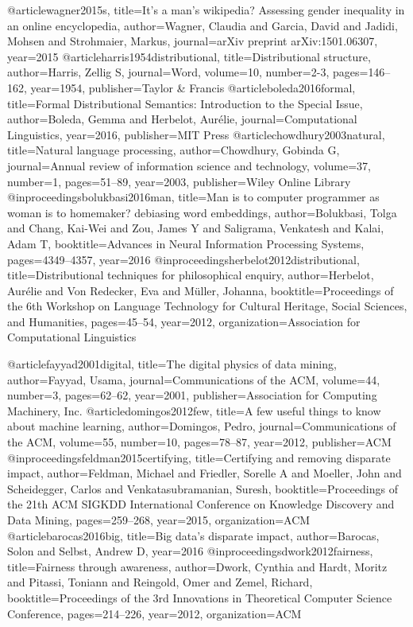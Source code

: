 @article{wagner2015s,
  title={It's a man's wikipedia? Assessing gender inequality in an online encyclopedia},
  author={Wagner, Claudia and Garcia, David and Jadidi, Mohsen and Strohmaier, Markus},
  journal={arXiv preprint arXiv:1501.06307},
  year={2015}
}
@article{harris1954distributional,
  title={Distributional structure},
  author={Harris, Zellig S},
  journal={Word},
  volume={10},
  number={2-3},
  pages={146--162},
  year={1954},
  publisher={Taylor \& Francis}
}
@article{boleda2016formal,
  title={Formal Distributional Semantics: Introduction to the Special Issue},
  author={Boleda, Gemma and Herbelot, Aur{\'e}lie},
  journal={Computational Linguistics},
  year={2016},
  publisher={MIT Press}
}
@article{chowdhury2003natural,
  title={Natural language processing},
  author={Chowdhury, Gobinda G},
  journal={Annual review of information science and technology},
  volume={37},
  number={1},
  pages={51--89},
  year={2003},
  publisher={Wiley Online Library}
}
@inproceedings{bolukbasi2016man,
  title={Man is to computer programmer as woman is to homemaker? debiasing word embeddings},
  author={Bolukbasi, Tolga and Chang, Kai-Wei and Zou, James Y and Saligrama, Venkatesh and Kalai, Adam T},
  booktitle={Advances in Neural Information Processing Systems},
  pages={4349--4357},
  year={2016}
}
@inproceedings{herbelot2012distributional,
  title={Distributional techniques for philosophical enquiry},
  author={Herbelot, Aur{\'e}lie and Von Redecker, Eva and M{\"u}ller, Johanna},
  booktitle={Proceedings of the 6th Workshop on Language Technology for Cultural Heritage, Social Sciences, and Humanities},
  pages={45--54},
  year={2012},
  organization={Association for Computational Linguistics}
}


@article{fayyad2001digital,
  title={The digital physics of data mining},
  author={Fayyad, Usama},
  journal={Communications of the ACM},
  volume={44},
  number={3},
  pages={62--62},
  year={2001},
  publisher={Association for Computing Machinery, Inc.}
}
@article{domingos2012few,
  title={A few useful things to know about machine learning},
  author={Domingos, Pedro},
  journal={Communications of the ACM},
  volume={55},
  number={10},
  pages={78--87},
  year={2012},
  publisher={ACM}
}
@inproceedings{feldman2015certifying,
  title={Certifying and removing disparate impact},
  author={Feldman, Michael and Friedler, Sorelle A and Moeller, John and Scheidegger, Carlos and Venkatasubramanian, Suresh},
  booktitle={Proceedings of the 21th ACM SIGKDD International Conference on Knowledge Discovery and Data Mining},
  pages={259--268},
  year={2015},
  organization={ACM}
}
@article{barocas2016big,
  title={Big data's disparate impact},
  author={Barocas, Solon and Selbst, Andrew D},
  year={2016}
}
@inproceedings{dwork2012fairness,
  title={Fairness through awareness},
  author={Dwork, Cynthia and Hardt, Moritz and Pitassi, Toniann and Reingold, Omer and Zemel, Richard},
  booktitle={Proceedings of the 3rd Innovations in Theoretical Computer Science Conference},
  pages={214--226},
  year={2012},
  organization={ACM}
}








